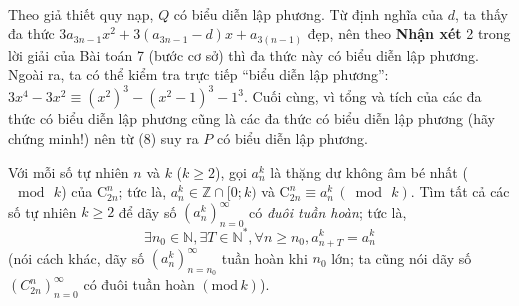\begin{bt}
{	\\Theo giả thiết quy nạp, $Q$ có biểu diễn lập phương. Từ định nghĩa của $d$, ta thấy đa thức $3a_{3n-1}x^{2}+3(a_{3n-1}-d)x+a_{3(n-1)}$ đẹp, nên theo \textbf{Nhận xét} 2 trong lời giải của Bài toán 7 (bước cơ sở) thì đa thức này có biểu diễn lập phương. Ngoài ra, ta có thể kiểm tra trực tiếp ``biểu diễn lập phương'': $3x^{4}-3x^{2}\equiv (x^{2})^{3}-(x^{2}-1)^{3}-1^{3}$. Cuối cùng, vì tổng và tích của các đa thức có biểu diễn lập phương cũng là các đa thức có biểu diễn lập phương (hãy chứng minh!) nên từ (8) suy ra $P$ có biểu diễn lập phương.
	}
\end{bt}

\begin{bt}%
	Với mỗi số tự nhiên $n$ và $k$ ($k\ge 2$), gọi $a_n^k$ là thặng dư không âm bé nhất ($\mod\,k$) của $\mathrm{C}_{2n}^n$; tức là, $a_n^k \in \mathbb{Z}\cap [0;k)$ và $\mathrm{C}_{2n}^n\equiv a_n^k\, (\bmod\,k)$. Tìm tất cả các số tự nhiên $k\ge 2$ để dãy số $\left(a_n^k\right)_{n=0}^{\infty}$ có \textit{đuôi tuần hoàn}; tức là,
	\[\exists n_0 \in \mathbb{N}, \exists T\in \mathbb{N}^*, \forall n\ge n_0, a_{n+T}^k=a_n^k \]
	(nói cách khác, dãy số $\left(a_n^k\right)_{n=n_0}^{\infty}$ tuần hoàn khi $n_0$ lớn; ta cũng nói dãy số $\left(C_{2n}^n\right)_{n=0}^{\infty}$ có đuôi tuần hoàn $(\mathrm{mod}\, k)$).
\end{bt}

